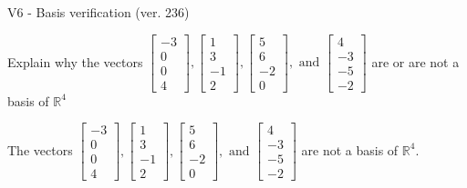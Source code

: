 \begin{exercise}
  \begin{exerciseTitle}V6 - Basis verification (ver. 236)\end{exerciseTitle}
  \begin{exerciseStatement}
    Explain why the vectors \(\left[\begin{array}{r}
-3 \\
0 \\
0 \\
4
\end{array}\right] , \left[\begin{array}{r}
1 \\
3 \\
-1 \\
2
\end{array}\right] , \left[\begin{array}{r}
5 \\
6 \\
-2 \\
0
\end{array}\right] , \text{ and } \left[\begin{array}{r}
4 \\
-3 \\
-5 \\
-2
\end{array}\right]\) are or are not a basis of \(\mathbb{R}^4\)	


  \end{exerciseStatement}
  \begin{exerciseAnswer}
   The vectors \(\left[\begin{array}{r}
-3 \\
0 \\
0 \\
4
\end{array}\right] , \left[\begin{array}{r}
1 \\
3 \\
-1 \\
2
\end{array}\right] , \left[\begin{array}{r}
5 \\
6 \\
-2 \\
0
\end{array}\right] , \text{ and } \left[\begin{array}{r}
4 \\
-3 \\
-5 \\
-2
\end{array}\right]\) 
  	 are not  a basis of \(\mathbb{R}^4\).
  


  \end{exerciseAnswer}
\end{exercise}